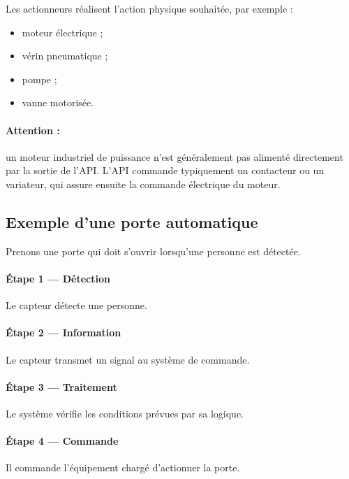 \documentclass[12pt,a4paper]{book}
\begin{document}
Les actionneurs réalisent l'action physique souhaitée, par exemple :

\begin{itemize}
    \item moteur électrique ;
    \item vérin pneumatique ;
    \item pompe ;
    \item vanne motorisée.
\end{itemize}

\paragraph{Attention :} un moteur industriel de puissance n'est généralement pas alimenté directement par la sortie de l'API. L'API commande typiquement un contacteur ou un variateur, qui assure ensuite la commande électrique du moteur.

\subsection{Exemple d'une porte automatique}

Prenons une porte qui doit s'ouvrir lorsqu'une personne est détectée.

\paragraph{Étape 1 --- Détection}

Le capteur détecte une personne.

\paragraph{Étape 2 --- Information}

Le capteur transmet un signal au système de commande.

\paragraph{Étape 3 --- Traitement}

Le système vérifie les conditions prévues par sa logique.

\paragraph{Étape 4 --- Commande}

Il commande l'équipement chargé d'actionner la porte.
\end{document}
